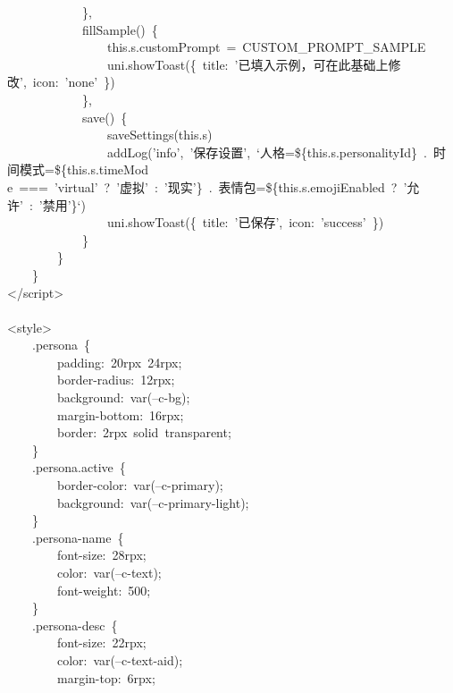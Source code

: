 \documentclass[a4paper,10pt]{article}
\begin{document}
{\ttfamily\footnotesize\raggedright
~~~~~~~~~~~~\},\\
~~~~~~~~~~~~fillSample()~\{\\
~~~~~~~~~~~~~~~~this.s.customPrompt~=~CUSTOM\_PROMPT\_SAMPLE\\
~~~~~~~~~~~~~~~~uni.showToast(\{~title:~'已填入示例，可在此基础上修改',~icon:~'none'~\})\\
~~~~~~~~~~~~\},\\
~~~~~~~~~~~~save()~\{\\
~~~~~~~~~~~~~~~~saveSettings(this.s)\\
~~~~~~~~~~~~~~~~addLog('info',~'保存设置',~`人格=\$\{this.s.personalityId\}~.~时间模式=\$\{this.s.timeMod\\
e~===~'virtual'~?~'虚拟'~:~'现实'\}~.~表情包=\$\{this.s.emojiEnabled~?~'允许'~:~'禁用'\}`)\\
~~~~~~~~~~~~~~~~uni.showToast(\{~title:~'已保存',~icon:~'success'~\})\\
~~~~~~~~~~~~\}\\
~~~~~~~~\}\\
~~~~\}\\
</script>\\
\mbox{}\\
<style>\\
~~~~.persona~\{\\
~~~~~~~~padding:~20rpx~24rpx;\\
~~~~~~~~border-radius:~12rpx;\\
~~~~~~~~background:~var(--c-bg);\\
~~~~~~~~margin-bottom:~16rpx;\\
~~~~~~~~border:~2rpx~solid~transparent;\\
~~~~\}\\
~~~~.persona.active~\{\\
~~~~~~~~border-color:~var(--c-primary);\\
~~~~~~~~background:~var(--c-primary-light);\\
~~~~\}\\
~~~~.persona-name~\{\\
~~~~~~~~font-size:~28rpx;\\
~~~~~~~~color:~var(--c-text);\\
~~~~~~~~font-weight:~500;\\
~~~~\}\\
~~~~.persona-desc~\{\\
~~~~~~~~font-size:~22rpx;\\
~~~~~~~~color:~var(--c-text-aid);\\
~~~~~~~~margin-top:~6rpx;\\
}
\end{document}
